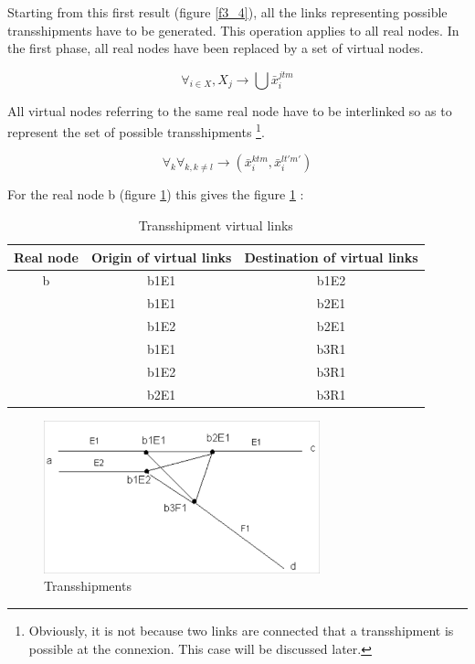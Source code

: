 Starting from this first result (figure \ref{f3_4}), all the links representing
possible transshipments have to be generated.  This operation applies to all
real nodes. In the first phase, all real nodes have been replaced by a set of
virtual nodes.

$$\forall_{i \in X}, X_j \rightarrow \bigcup \bar x_i^{jtm} $$

All virtual nodes referring to the same real node have to be interlinked so as
to represent the set of possible transshipments \footnote {Obviously, it is not
because two links are connected that a transshipment is possible at the connexion.  This case will be discussed later.}. 


$$\forall_k \forall_{k, k\neq l}\rightarrow (\bar x_i^{ktm}, \bar x_i^{lt'm'})$$

For the real node b (figure \ref{f3_5}) this gives the figure \ref{tab3_3} :

\begin{table}[htbp]
\begin{center}
\begin{tabular}{ccc}
\hline
Real node & Origin of virtual links & Destination of virtual links \\

\hline
b & b1E1 & b1E2\\

  & b1E1 & b2E1\\

  & b1E2 & b2E1\\

  & b1E1 & b3R1\\

  & b1E2 & b3R1\\

  & b2E1 & b3R1\\

\hline
\end{tabular}
\caption{\label{tab3_3} Transshipment virtual links}
\end{center}
\end{table}

\begin{figure}[htbp]
\centerline{\includegraphics[width=8cm]{f3_5.png}}
\caption{\label{f3_5} Transshipments}
\end{figure}



